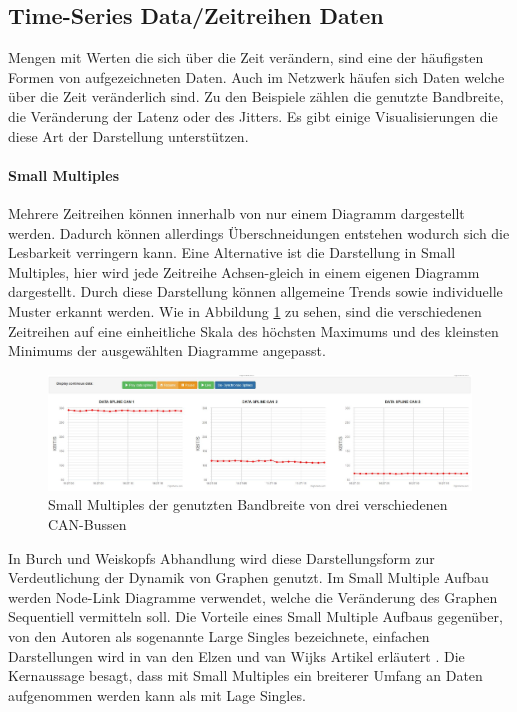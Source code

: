 \documentclass[draft=false
              ,paper=a4
              ,twoside=false
              ,fontsize=11pt
              ,headsepline
              ,BCOR10mm
              ,DIV11
              ]{scrbook}
\begin{document}
\subsection{Time-Series Data/Zeitreihen Daten} %
\label{ssub:time_series_data_zeitreihen_daten}
Mengen mit Werten die sich über die Zeit verändern, sind eine der häufigsten Formen von aufgezeichneten Daten. Auch im Netzwerk häufen sich Daten welche über die Zeit veränderlich sind. Zu den Beispiele zählen die genutzte Bandbreite, die Veränderung der Latenz oder des Jitters. Es gibt einige Visualisierungen die diese Art der Darstellung unterstützen. 

\paragraph{Small Multiples} %
\label{par:small_multiples}
Mehrere Zeitreihen können innerhalb von nur einem Diagramm dargestellt werden. Dadurch können allerdings Überschneidungen entstehen wodurch sich die Lesbarkeit verringern kann. Eine Alternative ist die Darstellung in Small Multiples, hier wird jede Zeitreihe Achsen-gleich in einem eigenen Diagramm dargestellt. Durch diese Darstellung können allgemeine Trends sowie individuelle Muster erkannt werden. Wie in Abbildung \ref{fig:synch_splines} zu sehen, sind die verschiedenen Zeitreihen auf eine einheitliche Skala des höchsten Maximums und des kleinsten Minimums der ausgewählten Diagramme angepasst.
\begin{figure}[htbp]
  \centering
  \includegraphics[width=\textwidth]{img/synch_splines}
  \caption{Small Multiples der genutzten Bandbreite von drei verschiedenen CAN-Bussen}
  \label{fig:synch_splines}
\end{figure}
In Burch und Weiskopfs Abhandlung \cite{Burch:2014:FES:2636240.2636839} wird diese Darstellungsform zur Verdeutlichung der Dynamik von Graphen genutzt. Im Small Multiple Aufbau werden Node-Link Diagramme verwendet, welche die Veränderung des Graphen Sequentiell vermitteln soll. Die Vorteile eines Small Multiple Aufbaus gegenüber, von den Autoren als sogenannte Large Singles bezeichnete, einfachen Darstellungen wird in van den Elzen und van Wijks Artikel erläutert \cite{elzen_small_multiple_2013}. Die Kernaussage besagt, dass mit Small Multiples ein breiterer Umfang an Daten aufgenommen werden kann als mit Lage Singles.
\end{document}

